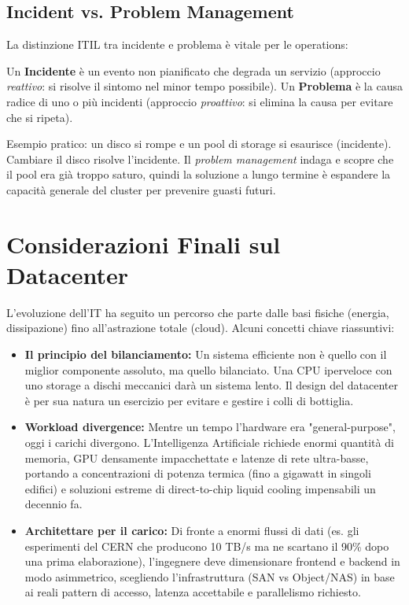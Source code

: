 \subsection{Incident vs. Problem Management}
La distinzione ITIL tra incidente e problema è vitale per le operations:
\begin{definitionbox}
Un \textbf{Incidente} è un evento non pianificato che degrada un servizio (approccio \textit{reattivo}: si risolve il sintomo nel minor tempo possibile).
Un \textbf{Problema} è la causa radice di uno o più incidenti (approccio \textit{proattivo}: si elimina la causa per evitare che si ripeta).
\end{definitionbox}
Esempio pratico: un disco si rompe e un pool di storage si esaurisce (incidente). Cambiare il disco risolve l'incidente. Il \textit{problem management} indaga e scopre che il pool era già troppo saturo, quindi la soluzione a lungo termine è espandere la capacità generale del cluster per prevenire guasti futuri.

\section{Considerazioni Finali sul Datacenter}
L'evoluzione dell'IT ha seguito un percorso che parte dalle basi fisiche (energia, dissipazione) fino all'astrazione totale (cloud). Alcuni concetti chiave riassuntivi:
\begin{itemize}
    \item \textbf{Il principio del bilanciamento:} Un sistema efficiente non è quello con il miglior componente assoluto, ma quello bilanciato. Una CPU iperveloce con uno storage a dischi meccanici darà un sistema lento. Il design del datacenter è per sua natura un esercizio per evitare e gestire i colli di bottiglia.
    \item \textbf{Workload divergence:} Mentre un tempo l'hardware era "general-purpose", oggi i carichi divergono. L'Intelligenza Artificiale richiede enormi quantità di memoria, GPU densamente impacchettate e latenze di rete ultra-basse, portando a concentrazioni di potenza termica (fino a gigawatt in singoli edifici) e soluzioni estreme di direct-to-chip liquid cooling impensabili un decennio fa.
    \item \textbf{Architettare per il carico:} Di fronte a enormi flussi di dati (es. gli esperimenti del CERN che producono 10 TB/s ma ne scartano il 90\% dopo una prima elaborazione), l'ingegnere deve dimensionare frontend e backend in modo asimmetrico, scegliendo l'infrastruttura (SAN vs Object/NAS) in base ai reali pattern di accesso, latenza accettabile e parallelismo richiesto.
\end{itemize}
